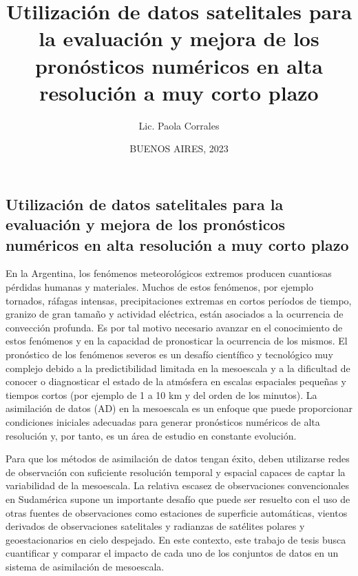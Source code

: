 \documentclass[12pt,oneside,a4paper]{reedthesis}
\title{Utilización de datos satelitales para la evaluación y mejora de los pronósticos numéricos en alta resolución a muy corto plazo}
\author{Lic. Paola Corrales}
\date{BUENOS AIRES, 2023}
\begin{document}
  \maketitle

\frontmatter %
\pagestyle{empty} %
  \begin{resumen}
    \hypertarget{utilizaciuxf3n-de-datos-satelitales-para-la-evaluaciuxf3n-y-mejora-de-los-pronuxf3sticos-numuxe9ricos-en-alta-resoluciuxf3n-a-muy-corto-plazo}{%
    \section*{Utilización de datos satelitales para la evaluación y mejora de los pronósticos numéricos en alta resolución a muy corto plazo}\label{utilizaciuxf3n-de-datos-satelitales-para-la-evaluaciuxf3n-y-mejora-de-los-pronuxf3sticos-numuxe9ricos-en-alta-resoluciuxf3n-a-muy-corto-plazo}}
    
    En la Argentina, los fenómenos meteorológicos extremos producen cuantiosas pérdidas humanas y materiales. Muchos de estos fenómenos, por ejemplo tornados, ráfagas intensas, precipitaciones extremas en cortos períodos de tiempo, granizo de gran tamaño y actividad eléctrica, están asociados a la ocurrencia de convección profunda. Es por tal motivo necesario avanzar en el conocimiento de estos fenómenos y en la capacidad de pronosticar la ocurrencia de los mismos. El pronóstico de los fenómenos severos es un desafío científico y tecnológico muy complejo debido a la predictibilidad limitada en la mesoescala y a la dificultad de conocer o diagnosticar el estado de la atmósfera en escalas espaciales pequeñas y tiempos cortos (por ejemplo de 1 a 10 km y del orden de los minutos). La asimilación de datos (AD) en la mesoescala es un enfoque que puede proporcionar condiciones iniciales adecuadas para generar pronósticos numéricos de alta resolución y, por tanto, es un área de estudio en constante evolución.
    
    Para que los métodos de asimilación de datos tengan éxito, deben utilizarse redes de observación con suficiente resolución temporal y espacial capaces de captar la variabilidad de la mesoescala. La relativa escasez de observaciones convencionales en Sudamérica supone un importante desafío que puede ser resuelto con el uso de otras fuentes de observaciones como estaciones de superficie automáticas, vientos derivados de observaciones satelitales y radianzas de satélites polares y geoestacionarios en cielo despejado. En este contexto, este trabajo de tesis busca cuantificar y comparar el impacto de cada uno de los conjuntos de datos en un sistema de asimilación de mesoescala.
    

\end{resumen}
\end{document}
